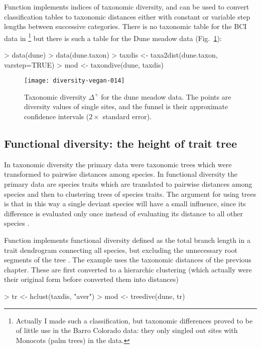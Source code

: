 \documentclass[a4paper,10pt,twocolumn]{article}
\begin{document}
Function  implements indices of taxonomic diversity,
and  can be used to convert classification tables to
taxonomic distances either with constant or variable step lengths
between successive categories. There is no taxonomic table for the BCI
data in \footnote{Actually I made such a classification,
  but taxonomic differences proved to be of little use in the Barro
  Colorado data: they only singled out sites with Monocots (palm
  trees) in the data.}
but there is such a table for the Dune meadow data (Fig.~\ref{fig:taxondive}):
\begin{Schunk}
\begin{Sinput}
> data(dune)
> data(dune.taxon)
> taxdis <- taxa2dist(dune.taxon, varstep=TRUE)
> mod <- taxondive(dune, taxdis)
\end{Sinput}
\end{Schunk}
\begin{figure}
\texttt{[image: diversity-vegan-014]}
\caption{Taxonomic diversity $\Delta^+$ for the dune meadow data. The
  points are diversity values of single sites, and the funnel is their
  approximate confidence intervals ($2 \times$ standard error).}
\label{fig:taxondive}
\end{figure}

\subsection{Functional diversity: the height of trait tree}

In taxonomic diversity the primary data were taxonomic trees which
were transformed to pairwise distances among species. In functional
diversity the primary data are species traits which are translated to
pairwise distances among species and then to clustering trees of
species traits. The argument for using trees is that in this way a
single deviant species will have a small influence, since its
difference is evaluated only once instead of evaluating its distance
to all other species \citep{PetcheyGaston06}.

Function  implements functional diversity defined as
the total branch length in a trait dendrogram connecting all species,
but excluding the unnecessary root segments of the tree
\citep{PetcheyGaston02, PetcheyGaston06}.  The example uses the
taxonomic distances of the previous chapter. These are first converted
to a hierarchic clustering (which actually were their original form
before  converted them into distances)
\begin{Schunk}
\begin{Sinput}
> tr <- hclust(taxdis, "aver")
> mod <- treedive(dune, tr)
\end{Sinput}
\end{Schunk}
\end{document}
